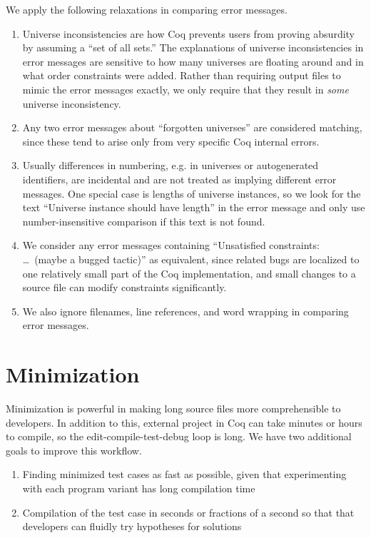 \documentclass[a4paper,USenglish,cleveref,autoref,thm-restate]{lipics-v2021}
\begin{document}
We apply the following relaxations in comparing error messages.
\begin{enumerate}

\item Universe inconsistencies are how Coq prevents users from proving absurdity by assuming a ``set of all sets.''
The explanations of universe inconsistencies in error messages are sensitive to how many universes are floating around and in what order constraints were added.
Rather than requiring output files to mimic the error messages exactly, we only require that they result in \emph{some} universe inconsistency.

\item Any two error messages about ``forgotten universes'' are considered matching, since these tend to arise only from very specific Coq internal errors.

\item Usually differences in numbering, e.g. in universes or autogenerated identifiers, are incidental and are not treated as implying different error messages.  One special case is lengths of universe instances, so we look for the text ``Universe instance should have length'' in the error message and only use number-insensitive comparison if this text is not found.

\item We consider any error messages containing ``Unsatisfied constraints: \ldots\ (maybe a bugged tactic)'' as equivalent, since related bugs are localized to one relatively small part of the Coq implementation, and small changes to a source file can modify constraints significantly.

\item We also ignore filenames, line references, and word wrapping in comparing error messages.

\end{enumerate}

\section{Minimization}

Minimization is powerful in making long source files more comprehensible to developers. 
In addition to this, external project in Coq can take minutes or hours to compile, so the edit-compile-test-debug loop is long.
We have two additional goals to improve this workflow.
\begin{enumerate}
\item Finding minimized test cases as fast as possible, given that experimenting with each program variant has long compilation time
\item Compilation of the test case in seconds or fractions of a second so that that developers can fluidly try hypotheses for solutions
\end{enumerate}
\end{document}
